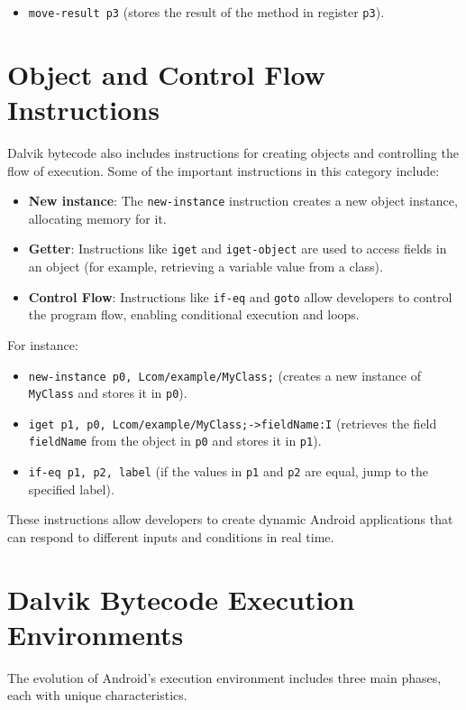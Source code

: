 \documentclass{article}
\begin{document}
\begin{itemize}
    \item \texttt{move-result p3} (stores the result of the method in register \texttt{p3}).
\end{itemize}

\section{Object and Control Flow Instructions}
Dalvik bytecode also includes instructions for creating objects and controlling the flow of execution. Some of the important instructions in this category include:

\begin{itemize}
    \item \textbf{New instance}: The \texttt{new-instance} instruction creates a new object instance, allocating memory for it.
    \item \textbf{Getter}: Instructions like \texttt{iget} and \texttt{iget-object} are used to access fields in an object (for example, retrieving a variable value from a class).
    \item \textbf{Control Flow}: Instructions like \texttt{if-eq} and \texttt{goto} allow developers to control the program flow, enabling conditional execution and loops.
\end{itemize}

For instance:

\begin{itemize}
    \item \texttt{new-instance p0, Lcom/example/MyClass;} (creates a new instance of \texttt{MyClass} and stores it in \texttt{p0}).
    \item \texttt{iget p1, p0, Lcom/example/MyClass;->fieldName:I} (retrieves the field \texttt{fieldName} from the object in \texttt{p0} and stores it in \texttt{p1}).
    \item \texttt{if-eq p1, p2, label} (if the values in \texttt{p1} and \texttt{p2} are equal, jump to the specified label).
\end{itemize}

These instructions allow developers to create dynamic Android applications that can respond to different inputs and conditions in real time.


\section{Dalvik Bytecode Execution Environments}
The evolution of Android's execution environment includes three main phases, each with unique characteristics.
\end{document}
